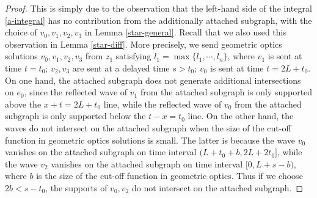 \documentclass[11pt]{amsart}
\theoremstyle{definition}
\theoremstyle{plain}
\numberwithin{equation}{section}
\begin{document}
\begin{proof}
This is simply due to the observation that the left-hand side of the integral \eqref{a-integral} has no contribution from the additionally attached subgraph, with the choice of $v_0,v_1,v_2,v_3$ in Lemma \ref{star-general}.
Recall that we also used this observation in Lemma \ref{star-diff}.
More precisely, we send geometric optics solutions $v_0,v_1,v_2,v_3$ from $z_1$ satisfying $l_1=\max \{l_1,\cdots,l_n\}$, where $v_1$ is sent at time $t=t_0$; $v_2,v_3$ are sent at a delayed time $s>t_0$;
$v_0$ is sent at time $t=2L+t_0$.
On one hand, the attached subgraph does not generate additional intersections on $e_0$, since the reflected wave of $v_1$ from the attached subgraph is only supported above the $x+t=2L+t_0$ line, while the reflected wave of $v_0$ from the attached subgraph is only supported below the $t-x=t_0$ line.
On the other hand, the waves do not intersect on the attached subgraph when the size of the cut-off function in geometric optics solutions is small.
The latter is because the wave $v_0$ vanishes on the attached subgraph on time interval $(L+t_0+b,2L+2t_0]$, while the wave $v_2$ vanishes on the attached subgraph on time interval $[0,L+s-b)$, where $b$ is the size of the cut-off function in geometric optics. Thus if we choose $2b<s-t_0$, the supports of $v_0,v_2$ do not intersect on the attached subgraph.
\end{proof}
\end{document}

